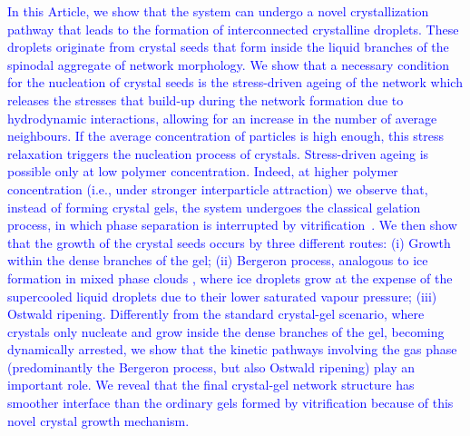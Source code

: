 \documentclass[preprint,amsmath,amssymb,superscriptaddress]{revtex4-1}
\begin{document}
\textcolor{blue}{
In this Article, we show that the system can undergo a novel crystallization pathway that leads to the formation of interconnected crystalline droplets. 
These droplets originate from crystal seeds that form inside the liquid branches of the spinodal aggregate of network morphology.
We show that a necessary condition for the nucleation of crystal seeds is the stress-driven ageing of the network which releases the stresses that build-up during the network formation due to hydrodynamic interactions, allowing for an increase in the number of average neighbours. 
If the average concentration of particles is high enough, this stress relaxation triggers the nucleation process of crystals. 
Stress-driven ageing is possible only at low polymer concentration. 
Indeed, at higher polymer concentration (i.e., under stronger interparticle attraction) we observe that, instead of forming crystal gels, the system undergoes the classical gelation process, in which
phase separation is interrupted by vitrification~\cite{verhaegh1997transient,tanaka1999colloid,Royall2007,lu2008gelation}.
We then show that the growth of the crystal seeds occurs by three different routes:
(i) Growth within the dense branches of the gel;
(ii) Bergeron process, analogous to ice formation in mixed phase clouds \cite{glickman2000glossary,morrison2012resilience}, where ice droplets grow at the
expense of the supercooled liquid droplets due to their lower saturated vapour pressure;
(iii) Ostwald ripening.
Differently from the standard crystal-gel scenario, where crystals only nucleate and grow inside the dense branches of the gel, becoming dynamically arrested, we show that the kinetic pathways involving the gas phase (predominantly the Bergeron process, but also Ostwald ripening) play an important role.
We reveal that the final crystal-gel network structure has smoother interface than the ordinary gels formed by vitrification because of this novel crystal growth mechanism.
}
\end{document}
